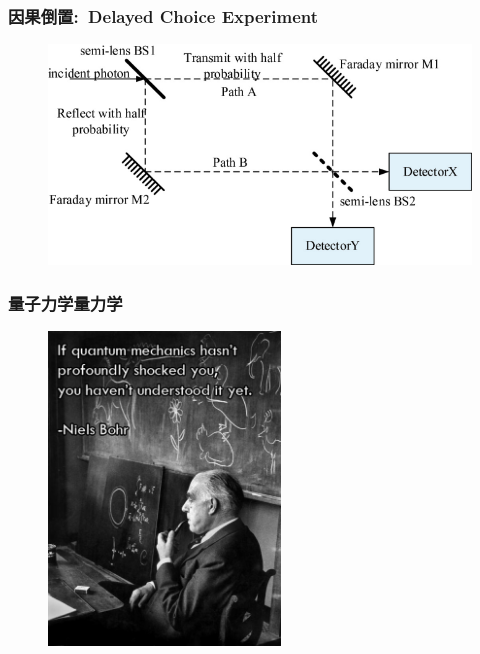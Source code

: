 {\frame
{
	\frametitle{因果倒置:~\textrm{Delayed Choice Experiment}}
\begin{figure}[h!]
\centering
\vspace{-10.5pt}
\includegraphics[height=0.55\textwidth,width=1.0\textwidth,viewport=0 0 690 370,clip]{Figures/Schematic-diagram-of-delayed_choice-experiment.png}
\caption{\fontsize{5.2pt}{3.9pt}}
\label{Delayed_Choice-Experiment}
\end{figure}
}

\frame
{
	\frametitle{量子力学量力学}
\begin{figure}[h!]
\centering
\vspace{-13.5pt}
\includegraphics[height=0.75\textwidth,width=0.55\textwidth,viewport=0 0 500 650,clip]{Figures/Quote-Niels_Bohr-on-Quantum_mechanics.png}
\caption{\fontsize{5.2pt}{3.9pt}}
\label{Quote-Niels_Bohr}
\end{figure}
}

}
